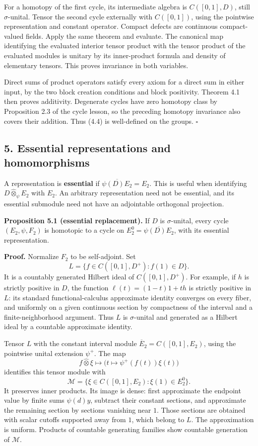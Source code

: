 \documentclass[
  11pt,
]{article}
\begin{document}
For a homotopy of the first cycle, its intermediate algebra is
\(C([0,1],D)\), still \(\sigma\)-unital. Tensor the second cycle
externally with \(C([0,1])\), using the pointwise representation and
constant operator. Compact defects are continuous compact-valued fields.
Apply the same theorem and evaluate. The canonical map identifying the
evaluated interior tensor product with the tensor product of the
evaluated modules is unitary by its inner-product formula and density of
elementary tensors. This proves invariance in both variables.

Direct sums of product operators satisfy every axiom for a direct sum in
either input, by the two block creation conditions and block positivity.
Theorem 4.1 then proves additivity. Degenerate cycles have zero homotopy
class by Proposition 2.3 of the cycle lesson, so the preceding homotopy
invariance also covers their addition. Thus (4.4) is well-defined on the
groups. \(\square\)

\subsection{5. Essential representations and
homomorphisms}\label{essential-representations-and-homomorphisms}

A representation is \textbf{essential} if \(\overline{\psi(D)E_2}=E_2\).
This is useful when identifying \(D\widehat\otimes_\psi E_2\) with
\(E_2\). An arbitrary representation need not be essential, and its
essential submodule need not have an adjointable orthogonal projection.

\textbf{Proposition 5.1 (essential replacement).} If \(D\) is
\(\sigma\)-unital, every cycle \((E_2,\psi,F_2)\) is homotopic to a
cycle on \(E_2^0=\overline{\psi(D)E_2}\), with its essential
representation.

\textbf{Proof.} Normalize \(F_2\) to be self-adjoint. Set \[
L=\{f\in C([0,1],D^+):f(1)\in D\}.
\] It is a countably generated Hilbert ideal of \(C([0,1],D^+)\). For
example, if \(h\) is strictly positive in \(D\), the function
\(\ell(t)=(1-t)1+th\) is strictly positive in \(L\): its standard
functional-calculus approximate identity converges on every fiber, and
uniformly on a given continuous section by compactness of the interval
and a finite-neighborhood argument. Thus \(L\) is \(\sigma\)-unital and
generated as a Hilbert ideal by a countable approximate identity.

Tensor \(L\) with the constant interval module
\(\overline E_2=C([0,1],E_2)\), using the pointwise unital extension
\(\psi^+\). The map \[
f\widehat\otimes \xi\longmapsto
\bigl(t\mapsto\psi^+(f(t))\xi(t)\bigr)
\] identifies this tensor module with \[
\mathcal M=\{\xi\in C([0,1],E_2):\xi(1)\in E_2^0\}.
\tag{5.1}
\] It preserves inner products. Its image is dense: first approximate
the endpoint value by finite sums \(\psi(d)y\), subtract their constant
sections, and approximate the remaining section by sections vanishing
near \(1\). Those sections are obtained with scalar cutoffs supported
away from \(1\), which belong to \(L\). The approximation is uniform.
Products of countable generating families show countable generation of
\(\mathcal M\).
\end{document}
